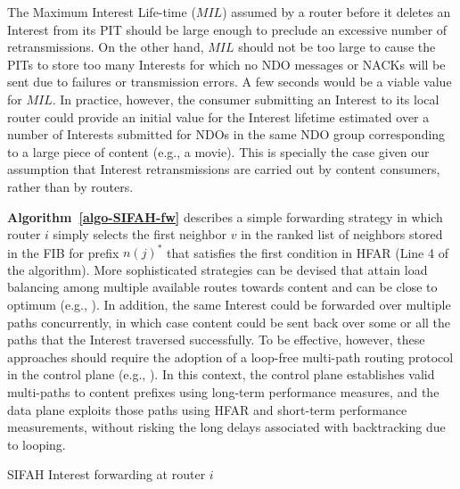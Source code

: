 \documentclass{ancs15-alternate}
\begin{document}
The Maximum Interest Life-time ($MIL$) assumed by a router  before it deletes an Interest from its PIT 
should be  large enough to preclude an excessive number of retransmissions.
On the other hand,  $MIL$ should not be too large to cause the PITs to store too many Interests for which no NDO messages or NACKs will be sent due to failures or transmission errors. 
A few seconds would be a viable value for $MIL$.
In practice, however, the consumer submitting an Interest to its local router could provide an initial value for the Interest lifetime estimated over a number of Interests submitted for NDOs in the same NDO group corresponding to a large piece of content (e.g., a movie).  This is specially the case given our assumption that Interest retransmissions are carried out by content consumers, rather than by routers.


{\bf Algorithm~\ref{algo-SIFAH-fw} } describes a simple forwarding strategy 
in which router $i$ simply selects the 
first  neighbor $v$
in the ranked list of neighbors stored in the FIB for prefix $n(j)^*$
that satisfies the first condition in HFAR (Line 4 of the algorithm).
More sophisticated strategies can be devised that attain load balancing among multiple available  routes towards content and can be close to optimum (e.g., \cite{vutukury}). In addition, the same Interest could be forwarded over multiple paths concurrently, in which case  content could be sent back  over some or all the paths that the Interest traversed successfully.
To be effective, however, these  approaches should  require the adoption of a loop-free  multi-path routing protocol in the control plane (e.g., \cite{dcr, dcr-mcast}). In this context, the control plane establishes valid multi-paths to content prefixes using  long-term performance measures, and the data plane exploits those paths using HFAR and short-term performance measurements, without risking the long delays associated with backtracking due to looping. 

\begin{algorithm}[h]
\caption{SIFAH  Interest forwarding at router $i$}
\label{algo-SIFAH-fw}
{\fontsize{8}{8}\selectfont
\begin{algorithmic}[1]

			\ENDIF
		\ENDFOR

\end{algorithmic}}
\end{algorithm}
\end{document}
